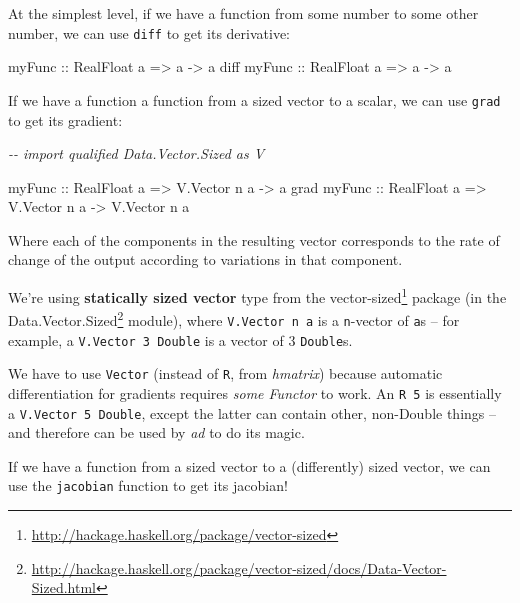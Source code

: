 \documentclass[]{article}
\newenvironment{Shaded}{}{}
\newcommand{\CommentTok}[1]{\textcolor[rgb]{0.38,0.63,0.69}{\textit{#1}}}
\newcommand{\DataTypeTok}[1]{\textcolor[rgb]{0.56,0.13,0.00}{#1}}
\newcommand{\NormalTok}[1]{#1}
\newcommand{\OtherTok}[1]{\textcolor[rgb]{0.00,0.44,0.13}{#1}}
\renewcommand{\href}[2]{#2\footnote{\url{#1}}}
\begin{document}
At the simplest level, if we have a function from some number to some other
number, we can use \texttt{diff} to get its derivative:

\begin{Shaded}
\begin{Highlighting}[]
\OtherTok{myFunc      ::} \DataTypeTok{RealFloat}\NormalTok{ a }\OtherTok{=>}\NormalTok{ a }\OtherTok{{-}>}\NormalTok{ a}
\NormalTok{diff}\OtherTok{ myFunc ::} \DataTypeTok{RealFloat}\NormalTok{ a }\OtherTok{=>}\NormalTok{ a }\OtherTok{{-}>}\NormalTok{ a}
\end{Highlighting}
\end{Shaded}

If we have a function a function from a sized vector to a scalar, we can use
\texttt{grad} to get its gradient:

\begin{Shaded}
\begin{Highlighting}[]
\CommentTok{{-}{-} import qualified Data.Vector.Sized as V}

\OtherTok{myFunc      ::} \DataTypeTok{RealFloat}\NormalTok{ a }\OtherTok{=>} \DataTypeTok{V.Vector}\NormalTok{ n a }\OtherTok{{-}>}\NormalTok{ a}
\NormalTok{grad}\OtherTok{ myFunc ::} \DataTypeTok{RealFloat}\NormalTok{ a }\OtherTok{=>} \DataTypeTok{V.Vector}\NormalTok{ n a }\OtherTok{{-}>} \DataTypeTok{V.Vector}\NormalTok{ n a}
\end{Highlighting}
\end{Shaded}

Where each of the components in the resulting vector corresponds to the rate of
change of the output according to variations in that component.

We're using \textbf{statically sized vector} type from the
\href{http://hackage.haskell.org/package/vector-sized}{vector-sized} package (in
the
\href{http://hackage.haskell.org/package/vector-sized/docs/Data-Vector-Sized.html}{Data.Vector.Sized}
module), where \texttt{V.Vector\ n\ a} is a \texttt{n}-vector of \texttt{a}s --
for example, a \texttt{V.Vector\ 3\ Double} is a vector of 3 \texttt{Double}s.

We have to use \texttt{Vector} (instead of \texttt{R}, from \emph{hmatrix})
because automatic differentiation for gradients requires \emph{some Functor} to
work. An \texttt{R\ 5} is essentially a \texttt{V.Vector\ 5\ Double}, except the
latter can contain other, non-Double things -- and therefore can be used by
\emph{ad} to do its magic.

If we have a function from a sized vector to a (differently) sized vector, we
can use the \texttt{jacobian} function to get its jacobian!
\end{document}
